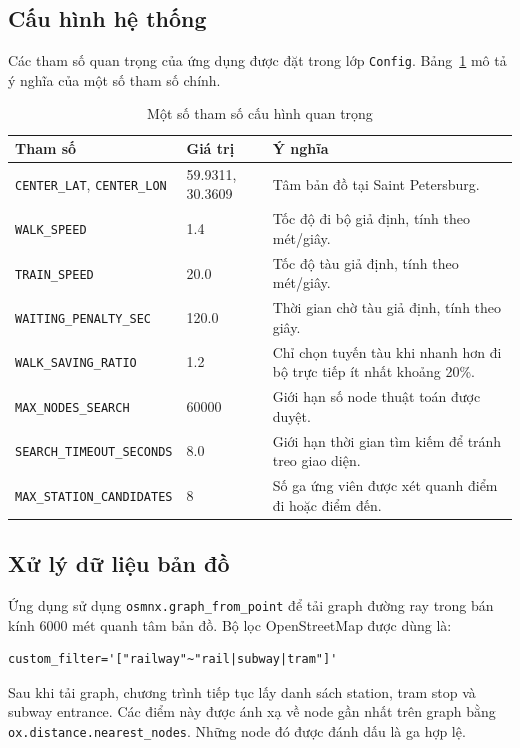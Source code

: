 \documentclass[12pt,a4paper]{article}
\begin{document}
\subsection{Cấu hình hệ thống}

Các tham số quan trọng của ứng dụng được đặt trong lớp \texttt{Config}. Bảng~\ref{tab:config} mô tả ý nghĩa của một số tham số chính.

\begin{table}[h]
\centering
\caption{Một số tham số cấu hình quan trọng}
\label{tab:config}
\begin{tabular}{p{4cm}p{3cm}p{6cm}}
\toprule
\textbf{Tham số} & \textbf{Giá trị} & \textbf{Ý nghĩa} \\
\midrule
\texttt{CENTER\_LAT}, \texttt{CENTER\_LON} & 59.9311, 30.3609 & Tâm bản đồ tại Saint Petersburg. \\
\texttt{WALK\_SPEED} & 1.4 & Tốc độ đi bộ giả định, tính theo mét/giây. \\
\texttt{TRAIN\_SPEED} & 20.0 & Tốc độ tàu giả định, tính theo mét/giây. \\
\texttt{WAITING\_PENALTY\_SEC} & 120.0 & Thời gian chờ tàu giả định, tính theo giây. \\
\texttt{WALK\_SAVING\_RATIO} & 1.2 & Chỉ chọn tuyến tàu khi nhanh hơn đi bộ trực tiếp ít nhất khoảng 20\%. \\
\texttt{MAX\_NODES\_SEARCH} & 60000 & Giới hạn số node thuật toán được duyệt. \\
\texttt{SEARCH\_TIMEOUT\_SECONDS} & 8.0 & Giới hạn thời gian tìm kiếm để tránh treo giao diện. \\
\texttt{MAX\_STATION\_CANDIDATES} & 8 & Số ga ứng viên được xét quanh điểm đi hoặc điểm đến. \\
\bottomrule
\end{tabular}
\end{table}

\subsection{Xử lý dữ liệu bản đồ}

Ứng dụng sử dụng \texttt{osmnx.graph\_from\_point} để tải graph đường ray trong bán kính 6000 mét quanh tâm bản đồ. Bộ lọc OpenStreetMap được dùng là:

\begin{lstlisting}[style=pythonstyle]
custom_filter='["railway"~"rail|subway|tram"]'
\end{lstlisting}

Sau khi tải graph, chương trình tiếp tục lấy danh sách station, tram stop và subway entrance. Các điểm này được ánh xạ về node gần nhất trên graph bằng \texttt{ox.distance.nearest\_nodes}. Những node đó được đánh dấu là ga hợp lệ.
\end{document}

